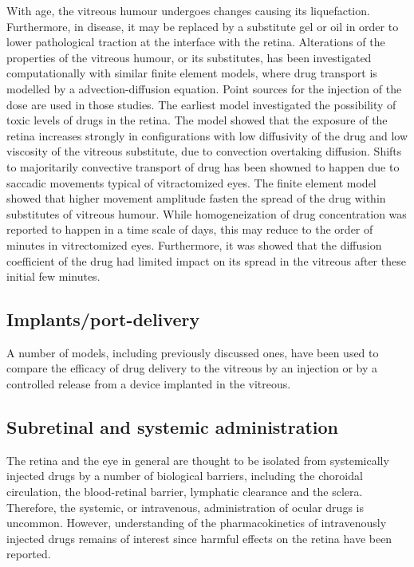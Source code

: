 \documentclass[12pt,a4paper]{journal}
\begin{document}
With age, the vitreous humour undergoes changes causing its liquefaction.
Furthermore, in disease, it may be replaced by a substitute gel or oil in order to lower pathological traction at the interface with the retina.
Alterations of the properties of the vitreous humour, or its substitutes, has been investigated computationally with similar finite element models, where drug transport is modelled by a advection-diffusion equation.\cite{Kathawate_2008,Modareszadeh_2012}
Point sources for the injection of the dose are used in those studies.
The earliest model investigated the possibility of toxic levels of drugs in the retina.\cite{Kathawate_2008}
The model showed that the exposure of the retina increases strongly in configurations with low diffusivity of the drug and low viscosity of the vitreous substitute, due to convection overtaking diffusion.\cite{Kathawate_2008}
Shifts to majoritarily convective transport of drug has been showned to happen due to saccadic movements typical of vitractomized eyes.\cite{Modareszadeh_2012}
The finite element model showed that higher movement amplitude fasten the spread of the drug within substitutes of vitreous humour.
While homogeneization of drug concentration was reported to happen in a time scale of days, this may reduce to the order of minutes in vitrectomized eyes.\cite{Modareszadeh_2012}
Furthermore, it was showed that the diffusion coefficient of the drug had limited impact on its spread in the vitreous after these initial few minutes.\cite{Modareszadeh_2012}


\subsection*{Implants/port-delivery}

A number of models, including previously discussed ones, have been used to compare the efficacy of drug delivery to the vitreous by an injection or by a controlled release from a device implanted in the vitreous.\cite{Jooybar_2014,Kathawate_2008,Kavousanakis_2014,Park_2005}




\subsection*{Subretinal and systemic administration}

The retina and the eye in general are thought to be isolated from systemically injected drugs by a number of biological barriers, including the choroidal circulation, the blood-retinal barrier, lymphatic clearance and the sclera.
Therefore, the systemic, or intravenous, administration of ocular drugs is uncommon.
However, understanding of the pharmacokinetics of intravenously injected drugs remains of interest since harmful effects on the retina have been reported.~\cite{Fu_2017}
\end{document}
